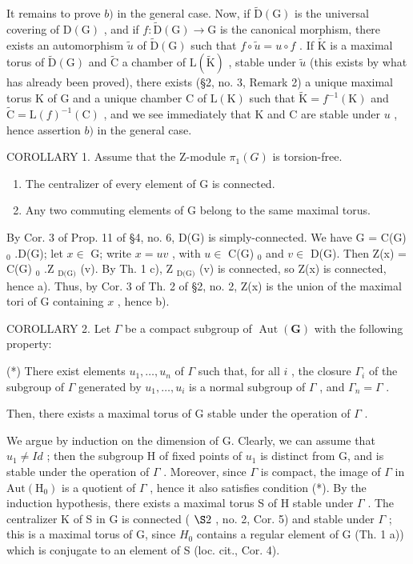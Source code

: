 It remains to prove \(b)\) in the general case. Now, if \(\tilde{\mathrm{D}}(\mathrm{G})\) is the universal covering of \(\mathrm{D}(\mathrm{G})\) , and if \(f: \tilde{\mathrm{D}}(\mathrm{G}) \to \mathrm{G}\) is the canonical morphism, there exists an automorphism \(\tilde{u}\) of \(\tilde{\mathrm{D}}(\mathrm{G})\) such that \(f \circ \tilde{u} = u \circ f\) . If \(\tilde{\mathrm{K}}\) is a maximal torus of \(\tilde{\mathrm{D}}(\mathrm{G})\) and \(\tilde{\mathrm{C}}\) a chamber of \(\mathrm{L}(\tilde{\mathrm{K}})\) , stable under \(\tilde{u}\) (this exists by what has already been proved), there exists (§2, no. 3, Remark 2) a unique maximal torus \(\mathrm{K}\) of \(\mathrm{G}\) and a unique chamber \(\mathrm{C}\) of \(\mathrm{L}(\mathrm{K})\) such that \(\tilde{\mathrm{K}} = f^{-1}(\mathrm{K})\) and \(\tilde{\mathrm{C}} = \mathrm{L}(f)^{-1}(\mathrm{C})\) , and we see immediately that \(\mathrm{K}\) and \(\mathrm{C}\) are stable under \(u\) , hence assertion \(b)\) in the general case.

COROLLARY 1. Assume that the Z-module \(\pi_{1}(G)\) is torsion-free.

\begin{enumerate}
\def\labelenumi{\alph{enumi})}
\item
  The centralizer of every element of G is connected.
\item
  Any two commuting elements of G belong to the same maximal torus.
\end{enumerate}

By Cor. 3 of Prop. 11 of §4, no. 6, D(G) is simply-connected. We have G = C(G) \(_0\) .D(G); let \(x \in\) G; write \(x = uv\) , with \(u \in\) C(G) \(_0\) and \(v \in\) D(G). Then Z(x) = C(G) \(_0\) .Z \(_{\text{D(G)}}\) (v). By Th. 1 c), Z \(_{\text{D(G)}}\) (v) is connected, so Z(x) is connected, hence a). Thus, by Cor. 3 of Th. 2 of §2, no. 2, Z(x) is the union of the maximal tori of G containing \(x\) , hence b).

COROLLARY 2. Let \(\Gamma\) be a compact subgroup of \(\operatorname{Aut}(\mathbf{G})\) with the following property:

(*) There exist elements \(u_{1}, \ldots, u_{n}\) of \(\Gamma\) such that, for all \(i\) , the closure \(\Gamma_{i}\) of the subgroup of \(\Gamma\) generated by \(u_{1}, \ldots, u_{i}\) is a normal subgroup of \(\Gamma\) , and \(\Gamma_{n} = \Gamma\) .

Then, there exists a maximal torus of G stable under the operation of \(\Gamma\) .

We argue by induction on the dimension of G. Clearly, we can assume that \(u_{1} \neq Id\) ; then the subgroup H of fixed points of \(u_{1}\) is distinct from G, and is stable under the operation of \(\varGamma\) . Moreover, since \(\varGamma\) is compact, the image of \(\varGamma\) in \(\mathrm{Aut}(\mathrm{H}_{0})\) is a quotient of \(\varGamma\) , hence it also satisfies condition (*). By the induction hypothesis, there exists a maximal torus S of H stable under \(\varGamma\) . The centralizer K of S in G is connected ( \(\S2\) , no. 2, Cor. 5) and stable under \(\varGamma\) ; this is a maximal torus of G, since \(H_{0}\) contains a regular element of G (Th. 1 a)) which is conjugate to an element of S (loc. cit., Cor. 4).


